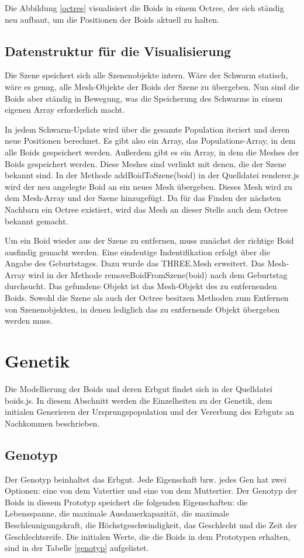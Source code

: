 \documentclass[draft=false
              ,paper=a4
              ,twoside=false
              ,fontsize=11pt
              ,headsepline
              ,BCOR10mm
              ,DIV11
              ,bibtotoc
              ,liststotoc
              ]{scrbook}
\begin{document}
Die Abbildung \ref{octree} visualisiert die Boids in einem Octree, der sich ständig neu aufbaut, um die Positionen der Boids aktuell zu halten.

\subsection{Datenstruktur für die Visualisierung}\label{visualstruktur}
Die Szene speichert sich alle Szenenobjekte intern. Wäre der Schwarm statisch, wäre es genug, alle Mesh-Objekte der Boids der Szene zu übergeben. Nun sind die Boids aber ständig in Bewegung, was die Speicherung des Schwarms in einem eigenen Array erforderlich macht.

In jedem Schwarm-Update wird über die gesamte Population iteriert und deren neue Positionen berechnet. Es gibt also ein Array, das Populations-Array, in dem alle Boids gespeichert werden. Außerdem gibt es ein Array, in dem die Meshes der Boids gespeichert werden. Diese Meshes sind verlinkt mit denen, die der Szene bekannt sind. In der Methode addBoidToSzene(boid) in der Quelldatei renderer.js wird der neu angelegte Boid an ein neues Mesh übergeben. Dieses Mesh wird zu dem Mesh-Array und der Szene hinzugefügt. Da für das Finden der nächsten Nachbarn ein Octree existiert, wird das Mesh an dieser Stelle auch dem Octree bekannt gemacht.

Um ein Boid wieder aus der Szene zu entfernen, muss zunächst der richtige Boid ausfindig gemacht werden. Eine eindeutige Indentifikation erfolgt über die Angabe des Geburtstages. Dazu wurde das THREE.Mesh erweitert. Das Mesh-Array wird in der Methode removeBoidFromSzene(boid) nach dem Geburtstag durchsucht. Das gefundene Objekt ist das Mesh-Objekt des zu entfernenden Boids. Sowohl die Szene als auch der Octree besitzen Methoden zum Entfernen von Szenenobjekten, in denen lediglich das zu entfernende Objekt übergeben werden muss.

\section{Genetik}
Die Modellierung der Boids und deren Erbgut findet sich in der Quelldatei boids.js. In diesem Abschnitt werden die Einzelheiten zu der Genetik, dem initialen Generieren der Ursprungspopulation und der Vererbung des Erbguts an Nachkommen beschrieben.

\subsection{Genotyp}
Der Genotyp beinhaltet das Erbgut. Jede Eigenschaft bzw. jedes Gen hat zwei Optionen: eine von dem Vatertier und eine von dem Muttertier. Der Genotyp der Boids in diesem Prototyp speichert die folgenden Eigenschaften: die Lebensspanne, die maximale Ausdauerkapazität, die maximale Beschleunigungskraft, die Höchstgeschwindigkeit, das Geschlecht und die Zeit der Geschlechtsreife. Die initialen Werte, die die Boids in dem Prototypen erhalten, sind in der Tabelle \ref{genotyp} aufgelistet.
\end{document}
